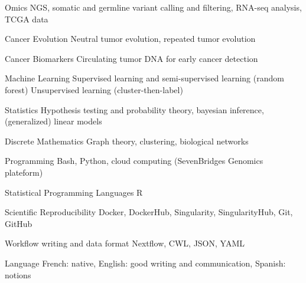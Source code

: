 

\begin{cvskills}


  \cvskill
    {Omics} %
    {NGS, somatic and germline variant calling and filtering, RNA-seq analysis, TCGA data} %

  \cvskill
    {Cancer Evolution} %
    {Neutral tumor evolution, repeated tumor evolution} %

  \cvskill
    {Cancer Biomarkers} %
    {Circulating tumor DNA for early cancer detection} %

  \cvskill
    {Machine Learning} %
    {Supervised learning and semi-supervised learning (random forest) \newline Unsupervised learning (cluster-then-label)} %

  \cvskill
    {Statistics} %
    {Hypothesis testing and probability theory, bayesian
inference, (generalized) linear models} %

  \cvskill
    {Discrete Mathematics} %
    {Graph theory, clustering, biological networks} %
    
  \cvskill
    {Programming} %
    {Bash, Python, cloud computing (SevenBridges Genomics plateform)} %

  \cvskill
    {Statistical Programming Languages} %
    {R} %

  \cvskill
    {Scientific Reproducibility} %
    {Docker, DockerHub, Singularity, SingularityHub, Git, GitHub} %

  \cvskill
    {Workflow writing and data format} %
    {Nextflow, CWL, JSON, YAML} %

  \cvskill
    {Language} %
    {French: native, English: good writing and communication, Spanish: notions} %

\end{cvskills}

